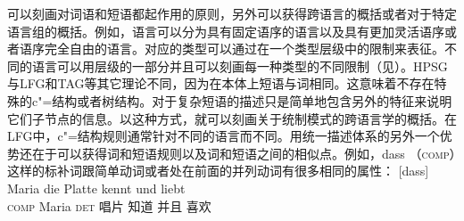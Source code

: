 可以刻画对词语和短语都起作用的原则，另外可以获得跨语言的概括或者对于特定语言组的概括。例如，语言可以分为具有固定语序的语言以及具有更加灵活语序或者语序完全自由的语言。对应的类型可以通过在一个类型层级中的限制来表征。不同的语言可以用层级的一部分并且可以刻画每一种类型的不同限制（见\citealp[\S~9.2]{AW98a}）。HPSG\indexhpsgc 与LFG\indexlfgc 和TAG\indextagc 等其它理论不同，因为在本体上短语与词相同。这意味着不存在特殊的c"=结构或者树结构。对于复杂短语的描述只是简单地包含另外的特征来说明它们子节点的信息。以这种方式，就可以刻画关于统制模式的跨语言学的概括。在LFG中，c"=结构规则通常针对不同的语言而不同。用统一描述体系的另外一个优势还在于可以获得词和短语规则以及词和短语之间的相似点。例如，dass （\textsc{comp}）这样的标补词跟简单动词或者处在前面的并列动词有很多相同的属性：
\eal
\ex
\gll {}[dass] Maria die Platte kennt und liebt\\
	 {}\spacebr{}\textsc{comp} Maria \textsc{det} 唱片 知道 并且 喜欢\\
